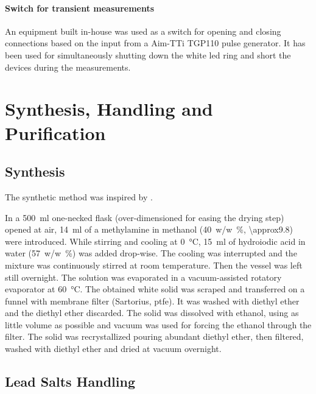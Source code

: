\paragraph{Switch for transient measurements} An equipment built in-house was used as a switch for opening and closing connections based on the input from a Aim-TTi TGP110 pulse generator.
It has been used for simultaneously shutting down the white \gls{led} ring and short the devices during the  measurements.


\section{Synthesis, Handling and Purification}

\subsection{ Synthesis}\label{methods-MAI}


The synthetic method was inspired by \cite{Im2011a}.

In a \SI{500}{\ml} one-necked flask (over-dimensioned for easing the drying step) opened at air, \SI{14}{\ml} of a methylamine in methanol (\SI{40}{w/w\%}, \SI{\approx9.8}{\Molar}) were introduced. While stirring and cooling at \SI{0}{\celsius}, \SI{15}{\ml} of hydroiodic acid in water (\SI{57}{w/w\%}) was added drop-wise. The cooling was interrupted and the mixture was continuously stirred at room temperature. Then the vessel was left still overnight.
The solution was evaporated in a vacuum-assisted rotatory evaporator at \SI{60}{\celsius}.
The obtained white solid was scraped and transferred on a funnel with membrane filter (Sartorius, \acrshort{ptfe}). It was washed with diethyl ether and the diethyl ether discarded. The solid was dissolved with ethanol, using as little volume as possible and vacuum was used for forcing the ethanol through the filter. The solid was recrystallized pouring abundant diethyl ether, then filtered, washed with diethyl ether and dried at vacuum overnight.

\subsection{Lead Salts Handling}

